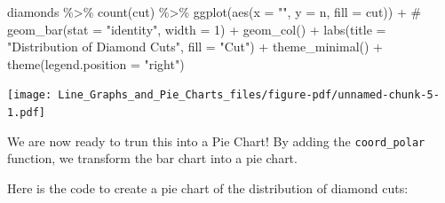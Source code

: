 \documentclass[
  letterpaper,
  DIV=11,
  numbers=noendperiod]{scrreprt}
\newenvironment{Shaded}{\begin{snugshade}}{\end{snugshade}}
\newcommand{\AttributeTok}[1]{\textcolor[rgb]{0.40,0.45,0.13}{#1}}
\newcommand{\CommentTok}[1]{\textcolor[rgb]{0.37,0.37,0.37}{#1}}
\newcommand{\FunctionTok}[1]{\textcolor[rgb]{0.28,0.35,0.67}{#1}}
\newcommand{\NormalTok}[1]{\textcolor[rgb]{0.00,0.23,0.31}{#1}}
\newcommand{\SpecialCharTok}[1]{\textcolor[rgb]{0.37,0.37,0.37}{#1}}
\newcommand{\StringTok}[1]{\textcolor[rgb]{0.13,0.47,0.30}{#1}}
\begin{document}
\begin{Shaded}
\begin{Highlighting}[]
\NormalTok{diamonds }\SpecialCharTok{\%\textgreater{}\%}
  \FunctionTok{count}\NormalTok{(cut) }\SpecialCharTok{\%\textgreater{}\%}
  \FunctionTok{ggplot}\NormalTok{(}\FunctionTok{aes}\NormalTok{(}\AttributeTok{x =} \StringTok{""}\NormalTok{, }\AttributeTok{y =}\NormalTok{ n, }\AttributeTok{fill =}\NormalTok{ cut)) }\SpecialCharTok{+}
\CommentTok{\#  geom\_bar(stat = "identity", width = 1) +}
  \FunctionTok{geom\_col}\NormalTok{() }\SpecialCharTok{+}
    \FunctionTok{labs}\NormalTok{(}\AttributeTok{title =} \StringTok{"Distribution of Diamond Cuts"}\NormalTok{,}
       \AttributeTok{fill =} \StringTok{"Cut"}\NormalTok{) }\SpecialCharTok{+}
  \FunctionTok{theme\_minimal}\NormalTok{() }\SpecialCharTok{+}
  \FunctionTok{theme}\NormalTok{(}\AttributeTok{legend.position =} \StringTok{"right"}\NormalTok{)}
\end{Highlighting}
\end{Shaded}

\texttt{[image: Line\_Graphs\_and\_Pie\_Charts\_files/figure-pdf/unnamed-chunk-5-1.pdf]}

We are now ready to trun this into a Pie Chart! By adding the
\texttt{coord\_polar} function, we transform the bar chart into a pie
chart.

Here is the code to create a pie chart of the distribution of diamond
cuts:
\end{document}
